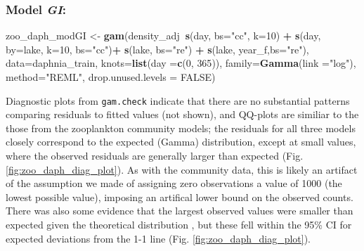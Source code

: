 \documentclass[12pt]{article}
\newenvironment{Shaded}{\begin{snugshade}}{\end{snugshade}}
\newcommand{\KeywordTok}[1]{\textcolor[rgb]{0.13,0.29,0.53}{\textbf{#1}}}
\newcommand{\DataTypeTok}[1]{\textcolor[rgb]{0.13,0.29,0.53}{#1}}
\newcommand{\DecValTok}[1]{\textcolor[rgb]{0.00,0.00,0.81}{#1}}
\newcommand{\StringTok}[1]{\textcolor[rgb]{0.31,0.60,0.02}{#1}}
\newcommand{\OtherTok}[1]{\textcolor[rgb]{0.56,0.35,0.01}{#1}}
\newcommand{\OperatorTok}[1]{\textcolor[rgb]{0.81,0.36,0.00}{\textbf{#1}}}
\newcommand{\NormalTok}[1]{#1}
\begin{document}
\subsubsection{\texorpdfstring{Model
\emph{GI}:}{Model GI:}}\label{model-gi}

\begin{Shaded}
\begin{Highlighting}[]
\NormalTok{zoo_daph_modGI <-}\StringTok{ }\KeywordTok{gam}\NormalTok{(density_adj}\OperatorTok{~}\KeywordTok{s}\NormalTok{(day, }\DataTypeTok{bs=}\StringTok{"cc"}\NormalTok{, }\DataTypeTok{k=}\DecValTok{10}\NormalTok{) }\OperatorTok{+}
\StringTok{                             }\KeywordTok{s}\NormalTok{(day, }\DataTypeTok{by=}\NormalTok{lake, }\DataTypeTok{k=}\DecValTok{10}\NormalTok{, }\DataTypeTok{bs=}\StringTok{"cc"}\NormalTok{)}\OperatorTok{+}
\StringTok{                             }\KeywordTok{s}\NormalTok{(lake, }\DataTypeTok{bs=}\StringTok{"re"}\NormalTok{) }\OperatorTok{+}\StringTok{ }
\StringTok{                             }\KeywordTok{s}\NormalTok{(lake, year_f,}\DataTypeTok{bs=}\StringTok{"re"}\NormalTok{),}
                     \DataTypeTok{data=}\NormalTok{daphnia_train,}
                     \DataTypeTok{knots=}\KeywordTok{list}\NormalTok{(}\DataTypeTok{day =}\KeywordTok{c}\NormalTok{(}\DecValTok{0}\NormalTok{, }\DecValTok{365}\NormalTok{)),}
                     \DataTypeTok{family=}\KeywordTok{Gamma}\NormalTok{(}\DataTypeTok{link =}\StringTok{"log"}\NormalTok{),}
                     \DataTypeTok{method=}\StringTok{"REML"}\NormalTok{,}
                     \DataTypeTok{drop.unused.levels =} \OtherTok{FALSE}\NormalTok{)}
\end{Highlighting}
\end{Shaded}

Diagnostic plots from \texttt{gam.check} indicate that there are no
substantial patterns comparing residuals to fitted values (not shown),
and QQ-plots are similiar to the those from the zooplankton community
models; the residuals for all three models closely correspond to the
expected (Gamma) distribution, except at small values, where the
observed residuals are generally larger than expected (Fig.
\ref{fig:zoo_daph_diag_plot}). As with the community data, this is
likely an artifact of the assumption we made of assigning zero
observations a value of 1000 (the lowest possible value), imposing an
artifical lower bound on the observed counts. There was also some
evidence that the largest observed values were smaller than expected
given the theoretical distribution , but these fell within the 95\% CI
for expected deviations from the 1-1 line (Fig.
\ref{fig:zoo_daph_diag_plot}).
\end{document}
